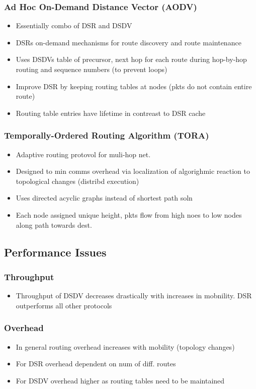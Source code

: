 \subsubsection{Ad Hoc On-Demand Distance Vector (AODV)}
\begin{itemize}
	\item Essentially combo of DSR and DSDV
	\item DSRs on-demand mechanisms for route discovery and route
		maintenance
	\item Uses DSDVs table of precursor, next hop for each route during
		hop-by-hop routing and sequence numbers (to prevent loops)
	\item Improve DSR by keeping routing tables at nodes (pkts do not
		contain entire route)
	\item Routing table entries have lifetime in contreast to DSR cache
\end{itemize}
\subsubsection{Temporally-Ordered Routing Algorithm (TORA)}
\begin{itemize}
	\item Adaptive routing protovol for muli-hop net.
	\item Designed to min comms overhead via localization of algorighmic
		reaction to topological changes (distribd execution)
	\item Uses directed acyclic graphs instead of shortest path soln
	\item Each node assigned unique height, pkts flow from high noes to low
		nodes along path towards dest.
\end{itemize}
\subsection{Performance Issues}
\subsubsection{Throughput}
\begin{itemize}
	\item Throughput of DSDV decreases drastically with increases in
		mobnility. DSR outperforms all other protocols
\end{itemize}
\subsubsection{Overhead}
\begin{itemize}
	\item In general routing overhead increases with mobility (topology
		changes)
	\item For DSR overhead dependent on num of diff. routes
	\item For DSDV overhead higher as routing tables need to be maintained
\end{itemize}
